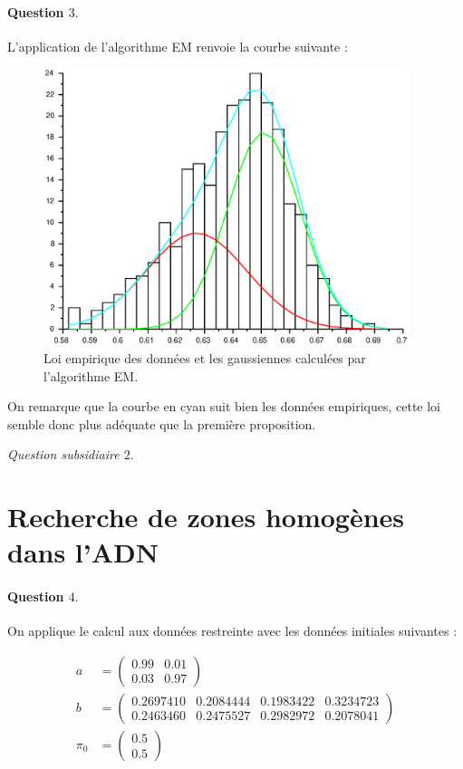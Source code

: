 \documentclass[12pt,a4paper]{article}
\begin{document}
\paragraph*{Question $3.$} L'application de l'algorithme EM renvoie la courbe suivante :

\begin{figure}[H]
	\centering
	\includegraphics[width=0.95\textwidth]{images/figure2.eps}
	\caption{Loi empirique des données et les gaussiennes calculées par l'algorithme EM.}
\end{figure}

On remarque que la courbe en cyan suit bien les données empiriques, cette loi semble donc plus adéquate que la première proposition.

\textit{Question subsidiaire $2.$} 

\section{Recherche de zones homogènes dans l'\textsc{ADN}}

\paragraph*{Question $4.$} On applique le calcul aux données restreinte avec les données initiales suivantes :

\begin{align*}
a &= \begin{pmatrix}
0.99 & 0.01 \\
0.03 & 0.97
\end{pmatrix} \\
b &= \begin{pmatrix}
0.2697410 & 0.2084444 & 0.1983422 & 0.3234723 \\
0.2463460 & 0.2475527 & 0.2982972 & 0.2078041
\end{pmatrix}\\
\pi_0 &= \begin{pmatrix}
0.5 \\
0.5
\end{pmatrix} \\
\end{align*}
\end{document}
